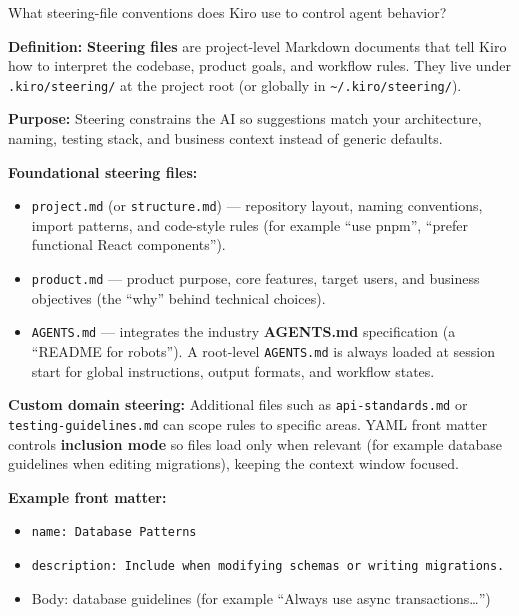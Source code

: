 


\newpage



\question[4]
What steering-file conventions does Kiro use to control agent behavior?
\begin{solutionorbox}[3.25in]
\textbf{Definition:} \textbf{Steering files} are project-level Markdown documents that tell Kiro how to interpret the codebase, product goals, and workflow rules. They live under \lstinline[style=bashinline]|.kiro/steering/| at the project root (or globally in \lstinline[style=bashinline]!~/.kiro/steering/!).

\textbf{Purpose:} Steering constrains the AI so suggestions match your architecture, naming, testing stack, and business context instead of generic defaults.

\textbf{Foundational steering files:}
\begin{itemize}
  \item \texttt{project.md} (or \texttt{structure.md}) --- repository layout, naming conventions, import patterns, and code-style rules (for example ``use pnpm'', ``prefer functional React components'').
  \item \texttt{product.md} --- product purpose, core features, target users, and business objectives (the ``why'' behind technical choices).
  \item \texttt{AGENTS.md} --- integrates the industry \textbf{AGENTS.md} specification (a ``README for robots''). A root-level \texttt{AGENTS.md} is always loaded at session start for global instructions, output formats, and workflow states.
\end{itemize}

\textbf{Custom domain steering:} Additional files such as \texttt{api-standards.md} or \texttt{testing-guidelines.md} can scope rules to specific areas. YAML front matter controls \textbf{inclusion mode} so files load only when relevant (for example database guidelines when editing migrations), keeping the context window focused.

\textbf{Example front matter:}
\begin{itemize}
  \item \texttt{name: Database Patterns}
  \item \texttt{description: Include when modifying schemas or writing migrations.}
  \item Body: database guidelines (for example ``Always use async transactions\ldots'')
\end{itemize}
\end{solutionorbox}

